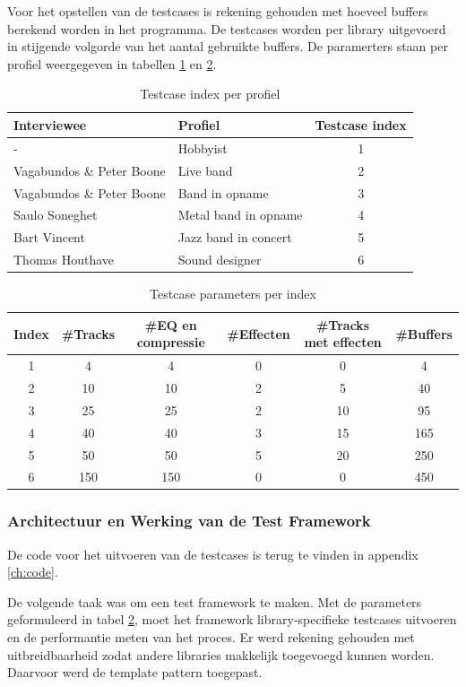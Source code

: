 Voor het opstellen van de testcases is rekening gehouden met hoeveel buffers berekend worden in het programma. De testcases worden per library uitgevoerd in stijgende volgorde van het aantal gebruikte buffers. De paramerters staan per profiel weergegeven in tabellen \ref{tab:profielen} en \ref{tab:parameters}.

\begin{table}[]
\begin{tabular}{ll|c}
\textbf{Interviewee} & \textbf{Profiel} & \textbf{Testcase index} \\ \hline
- & Hobbyist & 1 \\
Vagabundos \& Peter Boone & Live band & 2 \\
Vagabundos \& Peter Boone & Band in opname & 3 \\
Saulo Soneghet & Metal band in opname & 4 \\
Bart Vincent & Jazz band in concert & 5 \\
Thomas Houthave & Sound designer & 6 \\ \hline
\end{tabular}
\caption{Testcase index per profiel}
\label{tab:profielen}
\end{table}

\begin{table}[]
\begin{tabular}{c|cccc|c}
\textbf{Index} & \textbf{\#Tracks} & \textbf{\#EQ en compressie} & \textbf{\#Effecten} & \textbf{\#Tracks met effecten} & \textbf{\#Buffers} \\ \hline
1 & 4 & 4 & 0 & 0 & 4 \\
2 & 10 & 10 & 2 & 5 & 40 \\
3 & 25 & 25 & 2 & 10 & 95 \\
4 & 40 & 40 & 3 & 15 & 165 \\
5 & 50 & 50 & 5 & 20 & 250 \\
6 & 150 & 150 & 0 & 0 & 450 
\end{tabular}
\caption{Testcase parameters per index}
\label{tab:parameters}
\end{table}

\subsubsection{Architectuur en Werking van de Test Framework}

De code voor het uitvoeren van de testcases is terug te vinden in appendix \ref{ch:code}.

De volgende taak was om een test framework te maken. Met de parameters geformuleerd in tabel \ref{tab:parameters}, moet het framework library-specifieke testcases uitvoeren en de performantie meten van het proces. Er werd rekening gehouden met uitbreidbaarheid zodat andere libraries makkelijk toegevoegd kunnen worden. Daarvoor werd de template pattern toegepast.

